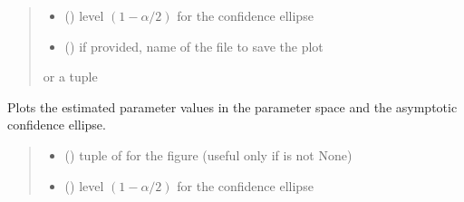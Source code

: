 \documentclass[letterpaper,10pt,english]{sphinxmanual}
\begin{document}
\begin{fulllineitems}
\begin{fulllineitems}
\begin{quote}
\begin{description}
\begin{itemize}
\item {} 
\sphinxAtStartPar
{} () \textendash{} level \((1-\alpha/2)\) for the confidence ellipse

\item {} 
\sphinxAtStartPar
{} () \textendash{} if provided, name of the file to save the plot

\end{itemize}

\sphinxAtStartPar
{} or a tuple 

\end{description}\end{quote}

\end{fulllineitems}


\begin{fulllineitems}
\label{\detokenize{cubmods:cubmods.cub.CUBresCUB00.plot_confell}}
\pysigstartsignatures
{}
\pysigstopsignatures
\sphinxAtStartPar
Plots the estimated parameter values in the parameter space and
the asymptotic confidence ellipse.
\begin{quote}\begin{description}
\begin{itemize}
\item {} 
\sphinxAtStartPar
{} () \textendash{} tuple of  for the figure (useful only if  is not None)

\item {} 
\sphinxAtStartPar
{} () \textendash{} level \((1-\alpha/2)\) for the confidence ellipse


\end{itemize}
\end{description}
\end{quote}
\end{fulllineitems}
\end{fulllineitems}
\end{document}

